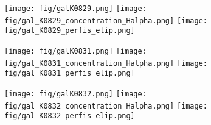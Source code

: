 \begin{figure}[!ht]
\begin{center}
\setcaptionmargin{1cm}
\texttt{[image: fig/galK0829.png]}
\texttt{[image: fig/gal\_K0829\_concentration\_Halpha.png]}
\texttt{[image: fig/gal\_K0829\_perfis\_elip.png]}
\end{center}
\end{figure}


\begin{figure}[!ht]
\begin{center}
\setcaptionmargin{1cm}
\texttt{[image: fig/galK0831.png]}
\texttt{[image: fig/gal\_K0831\_concentration\_Halpha.png]}
\texttt{[image: fig/gal\_K0831\_perfis\_elip.png]}
\end{center}
\end{figure}


\begin{figure}[!ht]
\begin{center}
\setcaptionmargin{1cm}
\texttt{[image: fig/galK0832.png]}
\texttt{[image: fig/gal\_K0832\_concentration\_Halpha.png]}
\texttt{[image: fig/gal\_K0832\_perfis\_elip.png]}
\end{center}
\end{figure}

